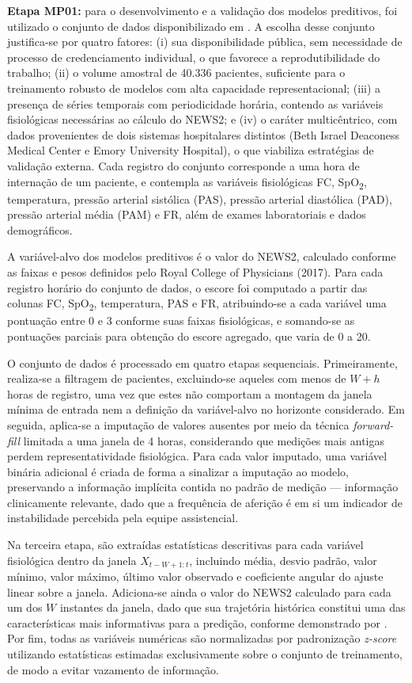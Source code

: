 \textbf{Etapa MP01:} para o desenvolvimento e a validação dos modelos preditivos, foi utilizado o conjunto de dados disponibilizado em \cite{REYNA}. A escolha desse conjunto justifica-se por quatro fatores: (i) sua disponibilidade pública, sem necessidade de processo de credenciamento individual, o que favorece a reprodutibilidade do trabalho; (ii) o volume amostral de 40.336 pacientes, suficiente para o treinamento robusto de modelos com alta capacidade representacional; (iii) a presença de séries temporais com periodicidade horária, contendo as variáveis fisiológicas necessárias ao cálculo do NEWS2; e (iv) o caráter multicêntrico, com dados provenientes de dois sistemas hospitalares distintos (Beth Israel Deaconess Medical Center e Emory University Hospital), o que viabiliza estratégias de validação externa.
Cada registro do conjunto corresponde a uma hora de internação de um paciente, e contempla as variáveis fisiológicas FC, SpO\textsubscript{2}, temperatura, pressão arterial sistólica (PAS), pressão arterial diastólica (PAD), pressão arterial média (PAM) e FR, além de exames laboratoriais e dados demográficos.

A variável-alvo dos modelos preditivos é o valor do NEWS2, calculado conforme as faixas e pesos definidos pelo Royal College of Physicians (2017). Para cada registro horário do conjunto de dados, o escore foi computado a partir das colunas FC, SpO\textsubscript{2}, temperatura, PAS e FR, atribuindo-se a cada variável uma pontuação entre 0 e 3 conforme suas faixas fisiológicas, e somando-se as pontuações parciais para obtenção do escore agregado, que varia de 0 a 20.

O conjunto de dados é processado em quatro etapas sequenciais. Primeiramente, realiza-se a filtragem de pacientes, excluindo-se aqueles com menos de $W + h$ horas de registro, uma vez que estes não comportam a montagem da janela mínima de entrada nem a definição da variável-alvo no horizonte considerado. Em seguida, aplica-se a imputação de valores ausentes por meio da técnica \textit{forward-fill} limitada a uma janela de 4 horas, considerando que medições mais antigas perdem representatividade fisiológica. Para cada valor imputado, uma variável binária adicional é criada de forma a sinalizar a imputação ao modelo, preservando a informação implícita contida no padrão de medição --- informação clinicamente relevante, dado que a frequência de aferição é em si um indicador de instabilidade percebida pela equipe assistencial.

Na terceira etapa, são extraídas estatísticas descritivas para cada variável fisiológica dentro da janela $X_{t-W+1:t}$, incluindo média, desvio padrão, valor mínimo, valor máximo, último valor observado e coeficiente angular do ajuste linear sobre a janela. Adiciona-se ainda o valor do NEWS2 calculado para cada um dos $W$ instantes da janela, dado que sua trajetória histórica constitui uma das características mais informativas para a predição, conforme demonstrado por . Por fim, todas as variáveis numéricas são normalizadas por padronização \textit{z-score} utilizando estatísticas estimadas exclusivamente sobre o conjunto de treinamento, de modo a evitar vazamento de informação.

